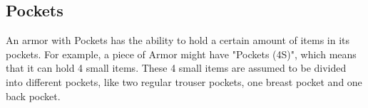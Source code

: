 \subsection{Pockets}\label{armor:pockets}
An armor with Pockets has the ability to hold a certain amount of items in its pockets.
For example, a piece of Armor might have "Pockets (4S)", which means that it can hold 4 small items.
These 4 small items are assumed to be divided into different pockets, like two regular trouser pockets, one breast pocket and one back pocket.